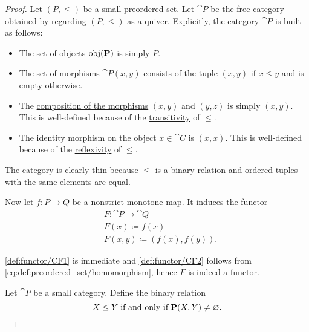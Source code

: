 \begin{proof}
   Let \( (P, \leq) \) be a small preordered set. Let \( \cat{P} \) be the \hyperref[def:quiver_free_category]{free category} obtained by regarding \( (P, \leq) \) as a \hyperref[def:quiver]{quiver}. Explicitly, the category \( \cat{P} \) is built as follows:
  \begin{itemize}
    \item The \hyperref[def:category/objects]{set of objects} \( \operatorname{obj}(\operatorname{\mathbf{P}}) \) is simply \( P \).

    \item The \hyperref[def:category/morphisms]{set of morphisms} \( \cat{P}(x, y) \) consists of the tuple \( (x, y) \) if \( x \leq y \) and is empty otherwise.

    \item The \hyperref[def:category/composition]{composition of the morphisms} \( (x, y) \) and \( (y, z) \) is simply \( (x, y) \). This is well-defined because of the \hyperref[def:binary_relation/transitive]{transitivity} of \( \leq \).

    \item The \hyperref[def:category/identity]{identity morphism} on the object \( x \in \cat{C} \) is \( (x, x) \). This is well-defined because of the \hyperref[def:binary_relation/reflexive]{reflexivity} of \( \leq \).
  \end{itemize}

  The category is clearly thin because \( \leq \) is a binary relation and ordered tuples with the same elements are equal.

  Now let \( f: P \to Q \) be a nonstrict monotone map. It induces the functor
  \begin{equation*}
    \begin{aligned}
      &F: \cat{P} \to \cat{Q} \\
      &F(x) \coloneqq f(x) \\
      &F(x, y) \coloneqq (f(x), f(y)).
    \end{aligned}
  \end{equation*}

  \ref{def:functor/CF1} is immediate and \ref{def:functor/CF2} follows from \eqref{eq:def:preordered_set/homomorphism}, hence \( F \) is indeed a functor.

   Let \( \cat{P} \) be a small category. Define the binary relation
  \begin{equation*}
    X \leq Y \T{if and only if} \cat{P}(X, Y) \neq \varnothing.
  \end{equation*}


\end{proof}
